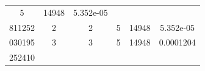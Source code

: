 \documentclass[10pt,]{article}
\begin{document}
\begin{longtable}[]{@{}cccccc@{}}
\begin{minipage}[t]{0.16\columnwidth}
5\strut
\end{minipage} & \begin{minipage}[t]{0.16\columnwidth}\centering\strut
14948\strut
\end{minipage} & \begin{minipage}[t]{0.12\columnwidth}\centering\strut
5.352e-05\strut
\end{minipage}\tabularnewline
\begin{minipage}[t]{0.20\columnwidth}\centering\strut
811252\strut
\end{minipage} & \begin{minipage}[t]{0.09\columnwidth}\centering\strut
2\strut
\end{minipage} & \begin{minipage}[t]{0.09\columnwidth}\centering\strut
2\strut
\end{minipage} & \begin{minipage}[t]{0.16\columnwidth}\centering\strut
5\strut
\end{minipage} & \begin{minipage}[t]{0.16\columnwidth}\centering\strut
14948\strut
\end{minipage} & \begin{minipage}[t]{0.12\columnwidth}\centering\strut
5.352e-05\strut
\end{minipage}\tabularnewline
\begin{minipage}[t]{0.20\columnwidth}\centering\strut
030195\strut
\end{minipage} & \begin{minipage}[t]{0.09\columnwidth}\centering\strut
3\strut
\end{minipage} & \begin{minipage}[t]{0.09\columnwidth}\centering\strut
3\strut
\end{minipage} & \begin{minipage}[t]{0.16\columnwidth}\centering\strut
5\strut
\end{minipage} & \begin{minipage}[t]{0.16\columnwidth}\centering\strut
14948\strut
\end{minipage} & \begin{minipage}[t]{0.12\columnwidth}\centering\strut
0.0001204\strut
\end{minipage}\tabularnewline
\begin{minipage}[t]{0.20\columnwidth}\centering\strut
252410\strut
\end{minipage} & \begin{minipage}[t]{0.09\columnwidth}\centering\strut

\end{minipage}
\end{longtable}
\end{document}
